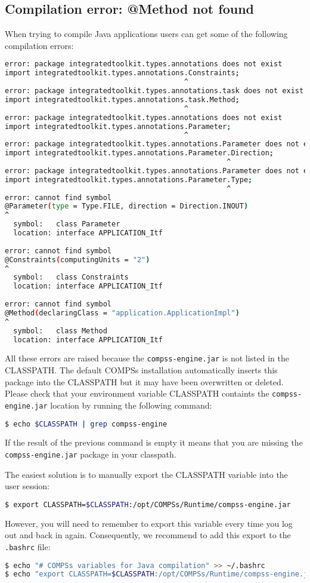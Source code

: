 \subsection{Compilation error: @Method not found}
When trying to compile Java applications users can get some of the following compilation errors:
\begin{lstlisting}[language=bash]
error: package integratedtoolkit.types.annotations does not exist
import integratedtoolkit.types.annotations.Constraints;
                                          ^
error: package integratedtoolkit.types.annotations.task does not exist
import integratedtoolkit.types.annotations.task.Method;
                                          ^
error: package integratedtoolkit.types.annotations does not exist
import integratedtoolkit.types.annotations.Parameter;
                                          ^
error: package integratedtoolkit.types.annotations.Parameter does not exist
import integratedtoolkit.types.annotations.Parameter.Direction;
                                                    ^
error: package integratedtoolkit.types.annotations.Parameter does not exist
import integratedtoolkit.types.annotations.Parameter.Type;
                                                    ^
error: cannot find symbol
@Parameter(type = Type.FILE, direction = Direction.INOUT)
^
  symbol:   class Parameter
  location: interface APPLICATION_Itf
  
error: cannot find symbol
@Constraints(computingUnits = "2")
^
  symbol:   class Constraints
  location: interface APPLICATION_Itf
  
error: cannot find symbol
@Method(declaringClass = "application.ApplicationImpl")
^
  symbol:   class Method
  location: interface APPLICATION_Itf
\end{lstlisting}

All these errors are raised because the \texttt{compss-engine.jar} is not listed in the CLASSPATH. The default COMPSs installation
automatically inserts this package into the CLASSPATH but it may have been overwritten or deleted. Please check that your 
environment variable CLASSPATH containts the \texttt{compss-engine.jar} location by running the following command:
\begin{lstlisting}[language=bash]
$ echo $CLASSPATH | grep compss-engine
\end{lstlisting}
If the result of the previous command is empty it means that you are missing the \texttt{compss-engine.jar} package in your classpath. 

The easiest solution is to manually export the CLASSPATH variable into the user session:
\begin{lstlisting}[language=bash]
$ export CLASSPATH=$CLASSPATH:/opt/COMPSs/Runtime/compss-engine.jar
\end{lstlisting}
However, you will need to remember to export this variable every time you log out and back in again. Consequently, we recommend to 
add this export to the \texttt{.bashrc} file:
\begin{lstlisting}[language=bash]
$ echo "# COMPSs variables for Java compilation" >> ~/.bashrc
$ echo "export CLASSPATH=$CLASSPATH:/opt/COMPSs/Runtime/compss-engine.jar" >> ~/.bashrc
\end{lstlisting}

